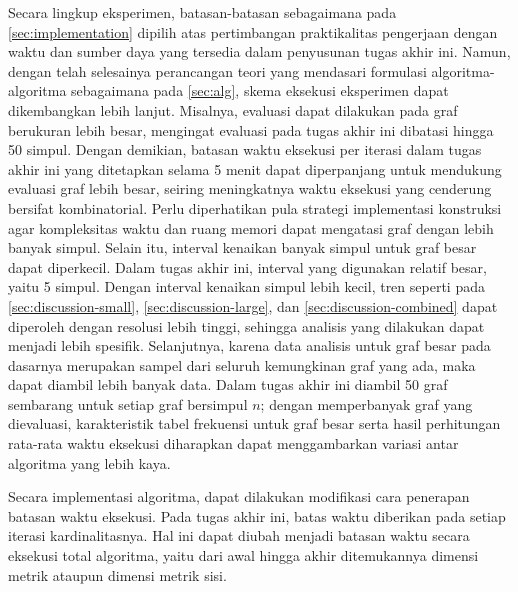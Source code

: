 Secara lingkup eksperimen, batasan-batasan sebagaimana pada \autoref{sec:implementation} dipilih atas pertimbangan praktikalitas pengerjaan dengan waktu dan sumber daya yang tersedia dalam penyusunan tugas akhir ini. Namun, dengan telah selesainya perancangan teori yang mendasari formulasi algoritma-algoritma sebagaimana pada \autoref{sec:alg}, skema eksekusi eksperimen dapat dikembangkan lebih lanjut. Misalnya, evaluasi dapat dilakukan pada graf berukuran lebih besar, mengingat evaluasi pada tugas akhir ini dibatasi hingga 50 simpul. Dengan demikian, batasan waktu eksekusi per iterasi dalam tugas akhir ini yang ditetapkan selama 5 menit dapat diperpanjang untuk mendukung evaluasi graf lebih besar, seiring meningkatnya waktu eksekusi yang cenderung bersifat kombinatorial. Perlu diperhatikan pula strategi implementasi konstruksi  agar kompleksitas waktu dan ruang memori dapat mengatasi graf dengan lebih banyak simpul. Selain itu, interval kenaikan banyak simpul untuk graf besar dapat diperkecil. Dalam tugas akhir ini, interval yang digunakan relatif besar, yaitu 5 simpul. Dengan interval kenaikan simpul lebih kecil, tren seperti pada \autoref{sec:discussion-small}, \autoref{sec:discussion-large}, dan \autoref{sec:discussion-combined} dapat diperoleh dengan resolusi lebih tinggi, sehingga analisis yang dilakukan dapat menjadi lebih spesifik. Selanjutnya, karena data analisis untuk graf besar pada dasarnya merupakan sampel dari seluruh kemungkinan graf yang ada, maka dapat diambil lebih banyak data. Dalam tugas akhir ini diambil 50 graf sembarang untuk setiap graf bersimpul \(n\); dengan memperbanyak graf yang dievaluasi, karakteristik tabel frekuensi untuk graf besar serta hasil perhitungan rata-rata waktu eksekusi diharapkan dapat menggambarkan variasi antar algoritma yang lebih kaya.

Secara implementasi algoritma, dapat dilakukan modifikasi cara penerapan batasan waktu eksekusi. Pada tugas akhir ini, batas waktu diberikan pada setiap iterasi kardinalitasnya. Hal ini dapat diubah menjadi batasan waktu secara eksekusi total algoritma, yaitu dari awal hingga akhir ditemukannya dimensi metrik ataupun dimensi metrik sisi.


